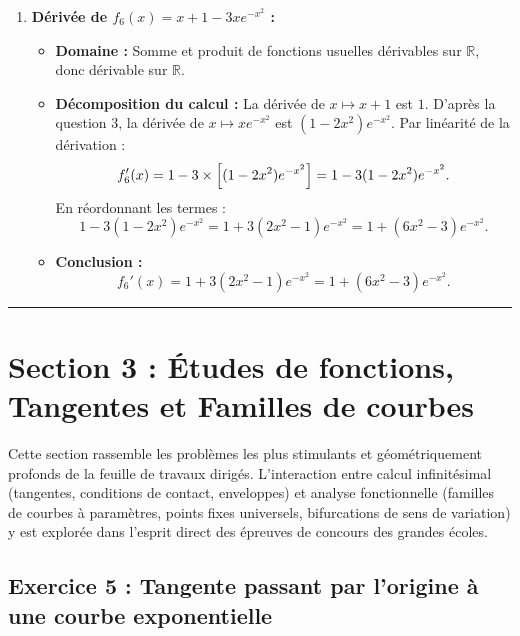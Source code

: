 \documentclass[11pt,a4paper]{article}
\newcommand{\R}{\mathbb{R}}
\begin{document}
\begin{correctionbox}[Exercice 4]
\begin{enumerate}[label=\textbf{\arabic*.}]
    \item \textbf{Dérivée de $f_6(x) = x + 1 - 3x e^{-x^2}$ :}
    \begin{itemize}
        \item \textbf{Domaine :} Somme et produit de fonctions usuelles dérivables sur $\R$, donc dérivable sur $\R$.
        \item \textbf{Décomposition du calcul :}
        La dérivée de $x \mapsto x + 1$ est $1$.
        D'après la question 3, la dérivée de $x \mapsto x e^{-x^2}$ est $(1 - 2x^2)e^{-x^2}$.
        Par linéarité de la dérivation :
        \[
        f_6'(x) = 1 - 3 \times \Bigl[(1 - 2x^2)e^{-x^2}\Bigr] = 1 - 3(1 - 2x^2)e^{-x^2}.
        \]
        En réordonnant les termes :
        \[
        1 - 3(1 - 2x^2)e^{-x^2} = 1 + 3(2x^2 - 1)e^{-x^2} = 1 + (6x^2 - 3)e^{-x^2}.
        \]
        \item \textbf{Conclusion :}
        \[
        \boxed{f_6'(x) = 1 + 3(2x^2 - 1)e^{-x^2} = 1 + (6x^2 - 3)e^{-x^2}}.
        \]
    \end{itemize}
\end{enumerate}
\end{correctionbox}

\vspace{0.8cm}
\hrule
\vspace{0.8cm}
\section{Section 3 : Études de fonctions, Tangentes et Familles de courbes}

Cette section rassemble les problèmes les plus stimulants et géométriquement profonds de la feuille de travaux dirigés. L'interaction entre calcul infinitésimal (tangentes, conditions de contact, enveloppes) et analyse fonctionnelle (familles de courbes à paramètres, points fixes universels, bifurcations de sens de variation) y est explorée dans l'esprit direct des épreuves de concours des grandes écoles.

\subsection*{Exercice 5 : Tangente passant par l'origine à une courbe exponentielle}
\end{document}
